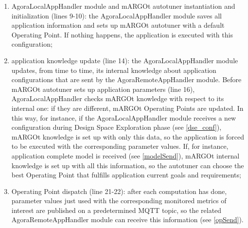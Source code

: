 \begin{enumerate}

    \item AgoraLocalAppHandler module and mARGOt autotuner instantiation and initialization (lines 9-10): the AgoraLocalAppHandler module saves all application information and sets up mARGOt autotuner with a default Operating Point. If nothing happens, the application is executed with this configuration;
    
    \item application knowledge update (line 14): the AgoraLocalAppHandler module updates, from time to time, its internal knowledge about application configurations that are sent by the AgoraRemoteAppHandler module. Before mARGOt autotuner sets up application parameters (line 16), AgoraLocalAppHandler checks mARGOt knowledge with respect to its internal one: if they are different, mARGOt Operating Points are updated. In this way, for instance, if the AgoraLocalAppHandler module receives a new configuration during Design Space Exploration phase (see \ref{dse_conf}), mARGOt knowledge is set up with only this data, so the application is forced to be executed with the corresponding parameter values. If, for instance, application complete model is received (see \ref{modelSend}), mARGOt internal knowledge is set up with all this information, so the autotuner can choose the best Operating Point that fulfills application current goals and requirements;
    
    \item Operating Point dispatch (line 21-22): after each computation has done, parameter values just used with the corresponding monitored metrics of interest are published on a predetermined MQTT topic, so the related AgoraRemoteAppHandler module can receive this information (see \ref{opSend}).
    
\end{enumerate}

